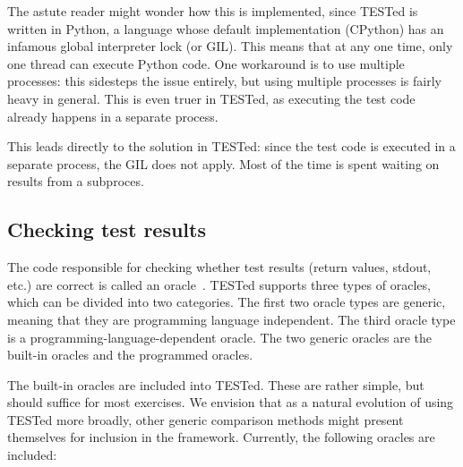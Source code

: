 \documentclass[../main]{subfiles}
\begin{document}
The astute reader might wonder how this is implemented, since TESTed is written in Python, a language whose default implementation (CPython) has an infamous global interpreter lock (or GIL).
This means that at any one time, only one thread can execute Python code.
One workaround is to use multiple processes: this sidesteps the issue entirely, but using multiple processes is fairly heavy in general.
This is even truer in TESTed, as executing the test code already happens in a separate process.

This leads directly to the solution in TESTed: since the test code is executed in a separate process, the GIL does not apply.
Most of the time is spent waiting on results from a subproces.

\subsection{Checking test results}\label{subsec:checking-results}

The code responsible for checking whether test results (return values, stdout, etc.) are correct is called an oracle~\autocite{howdenTheoreticalEmpiricalStudies1978}.
TESTed supports three types of oracles, which can be divided into two categories.
The first two oracle types are generic, meaning that they are programming language independent.
The third oracle type is a programming-language-dependent oracle.
The two generic oracles are the built-in oracles and the programmed oracles.

The built-in oracles are included into TESTed.
These are rather simple, but should suffice for most exercises.
We envision that as a natural evolution of using TESTed more broadly, other generic comparison methods might present themselves for inclusion in the framework.
Currently, the following oracles are included:
\end{document}
